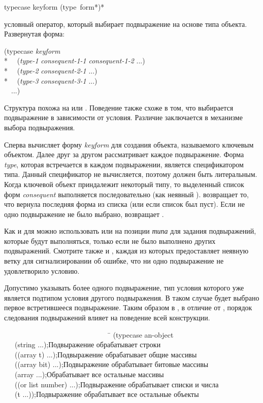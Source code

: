 \begin{defmac}
typecase keyform {(type {\,form}*)}*

 условный оператор, который выбирает подвыражение на основе типа
объекта.
Развернутая форма:
\begin{lisp}
(typecase \emph{keyform} \\*
~~(\emph{type-1} \emph{consequent-1-1} \emph{consequent-1-2} ...) \\*
~~(\emph{type-2} \emph{consequent-2-1} ...) \\*
~~(\emph{type-3} \emph{consequent-3-1} ...) \\
~~...)
\end{lisp}
Структура  похожа на  или . Поведение также
схоже в том, что выбирается подвыражение в зависимости от условия.
Различие заключается в механизме выбора подвыражения.

Сперва  вычисляет форму \emph{keyform} для создания объекта,
называемого ключевым объектом.
Далее  друг за другом рассматривает каждое подвыражение. Форма
\emph{type}, которая встречается в каждом подвыражении, является спецификатором
типа. Данный спецификатор не вычисляется, поэтому должен быть литеральным.
Когда ключевой объект приндалежит некоторый типу, то выделенный список форм
\emph{consequent} выполняется последовательно (как неявный
).  возвращает то, что вернула последняя форма из
списка (или {\false} если список был пуст).
Если не одно подвыражение не было выбрано,  возвращает {\false}.

Как и для  можно использовать {\true} или  на позиции
\emph{типа} для задания подвыражений, которые будут выполняться, только если не
было выполнено других подвыражений.
Смотрите также  и , каждая из которых
предоставляет неявную ветку  для сигнализировании об ошибке, что
ни одно подвыражение не удовлетворило условию.

Допустимо указывать более одного подвыражение, тип условия которого уже является
подтипом условия другого подвыражения. В таком случае будет выбрано первое
встретившееся подвыражение. Таким образом в , в отличие от
, порядок следования подвыражений влияет на поведение всей
конструкции.
\begin{lisp}
~~~~~~~~~~~~~~~~~~~~~~~~~~~~~~\=\kill
(typecase an-object \\
~~~(string ...)\>;\textrm{Подвыражение обрабатывает строки} \\
~~~((array t) ...)\>;\textrm{Подвыражение обрабатывает общие массивы} \\
~~~((array bit) ...)\>;\textrm{Подвыражение обрабатывает битовые массивы} \\
~~~(array ...)\>;\textrm{Обрабатывает все остальные массивы} \\
~~~((or list number) ...)\>;\textrm{Подвыражение обрабатывает списки и числа} \\
~~~(t ...))\>;\textrm{Подвыражение обрабатывает все остальные объекты}
\end{lisp}
\end{defmac}

